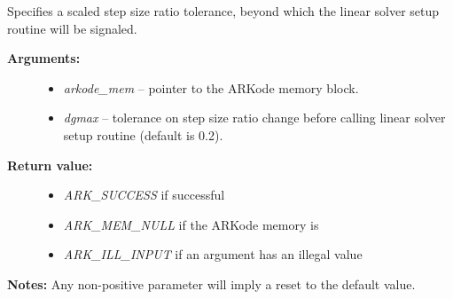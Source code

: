 \documentclass[letterpaper,10pt,english]{sphinxmanual}
\begin{document}
\begin{fulllineitems}
\label{c_interface/User_callable:ARKodeSetDeltaGammaMax}
Specifies a scaled step size ratio tolerance, beyond which the
linear solver setup routine will be signaled.
\begin{description}
\item[{\textbf{Arguments:}}] \leavevmode\begin{itemize}
\item {} 
\emph{arkode\_mem} -- pointer to the ARKode memory block.

\item {} 
\emph{dgmax} -- tolerance on step size ratio change before calling
linear solver setup routine (default is 0.2).

\end{itemize}

\item[{\textbf{Return value:}}] \leavevmode\begin{itemize}
\item {} 
\emph{ARK\_SUCCESS} if successful

\item {} 
\emph{ARK\_MEM\_NULL} if the ARKode memory is 

\item {} 
\emph{ARK\_ILL\_INPUT} if an argument has an illegal value

\end{itemize}

\end{description}

\textbf{Notes:}  Any non-positive parameter will imply a reset to the default value.

\end{fulllineitems}

\end{document}
